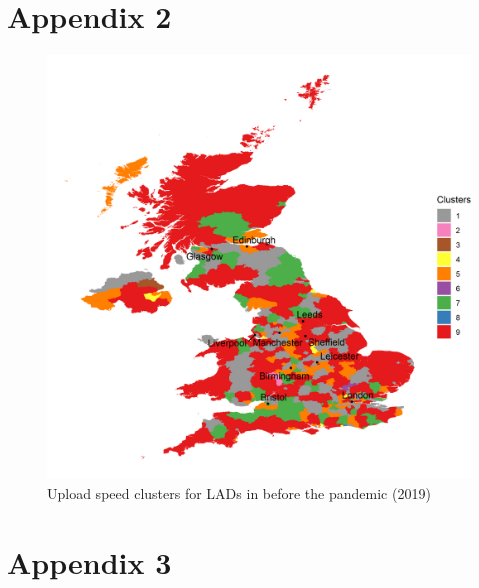 \documentclass[]{interact}
\theoremstyle{plain}%
\theoremstyle{definition}
\theoremstyle{remark}
\begin{document}
\hypertarget{appendix2}{%
\section*{Appendix 2}\label{appendix2}}

\begin{figure}
\includegraphics[width=1\linewidth]{figures/map.up.2019.clusters} \caption{\label{map.up.2019.clusters}Upload speed clusters for LADs in before the pandemic (2019)}\label{fig:unnamed-chunk-17}
\end{figure}

\pagebreak

\hypertarget{appendix3}{%
\section*{Appendix 3}\label{appendix3}}
\end{document}
